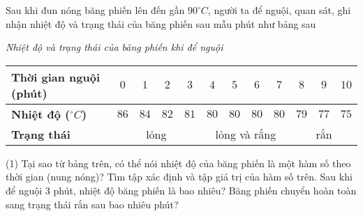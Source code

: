 \begin{vd}%
	Sau khi đun nóng băng phiến lên đến gần $90^{\circ}C$, người ta để nguội, quan sát, ghi nhận nhiệt độ và trạng thái của băng phiến sau mẫu phút như bảng sau
	\begin{center}
	\textit{Nhiệt độ và trạng thái của băng phiến khi để nguội}
		\begin{tabular}{|l|c|c|c|c|c|c|c|c|c|c|c|}
			\hline 
			\textbf{Thời gian nguội (phút)} & $0$ & $1$ & $2$ & $3$ & $4$ & $5$ & $6$ & $7$ & $8$ & $9$ & $10$ \\ 
			\hline 
			\textbf{Nhiệt độ ($^{\circ}C$)} & $86$ & $84$ & $82$ & $81$ & $80$ & $80$ & $80$  &$80$ & $79$ & $77$ & $75$ \\
			\hline
			\textbf{Trạng thái} & \multicolumn{4}{|c|}{lỏng} &\multicolumn{4}{|c|}{lỏng và rắng} & \multicolumn{3}{|c|}{rắn}\\
			\hline
		\end{tabular}
	\end{center}
\begin{tasks}(1)
	\task Tại sao từ bảng trên, có thể nói nhiệt độ của băng phiến là một hàm số theo thời gian (nung nóng)? Tìm tập xác định và tập giá trị của hàm số trên.
	\task Sau khi để nguội $3$ phút, nhiệt độ băng phiến là bao nhiêu?
	\task Băng phiến chuyển hoàn toàn sang trạng thái rắn sau bao nhiêu phút?
\end{tasks}
\end{vd}

